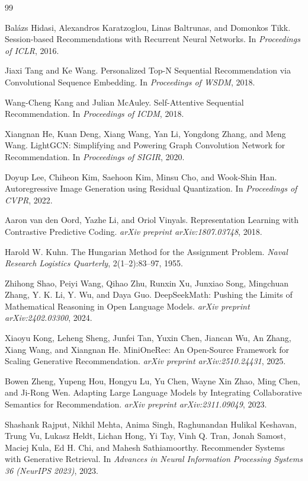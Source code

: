 \documentclass[11pt]{article}
\begin{document}
\begin{thebibliography}{99}

Bal\'azs Hidasi, Alexandros Karatzoglou, Linas Baltrunas, and Domonkos Tikk.
Session-based Recommendations with Recurrent Neural Networks.
In \textit{Proceedings of ICLR}, 2016.

Jiaxi Tang and Ke Wang.
Personalized Top-N Sequential Recommendation via Convolutional Sequence Embedding.
In \textit{Proceedings of WSDM}, 2018.

Wang-Cheng Kang and Julian McAuley.
Self-Attentive Sequential Recommendation.
In \textit{Proceedings of ICDM}, 2018.

Xiangnan He, Kuan Deng, Xiang Wang, Yan Li, Yongdong Zhang, and Meng Wang.
LightGCN: Simplifying and Powering Graph Convolution Network for Recommendation.
In \textit{Proceedings of SIGIR}, 2020.

Doyup Lee, Chiheon Kim, Saehoon Kim, Minsu Cho, and Wook-Shin Han.
Autoregressive Image Generation using Residual Quantization.
In \textit{Proceedings of CVPR}, 2022.

Aaron van den Oord, Yazhe Li, and Oriol Vinyals.
Representation Learning with Contrastive Predictive Coding.
\textit{arXiv preprint arXiv:1807.03748}, 2018.

Harold W. Kuhn.
The Hungarian Method for the Assignment Problem.
\textit{Naval Research Logistics Quarterly}, 2(1--2):83--97, 1955.

Zhihong Shao, Peiyi Wang, Qihao Zhu, Runxin Xu, Junxiao Song, Mingchuan Zhang, Y. K. Li, Y. Wu, and Daya Guo.
DeepSeekMath: Pushing the Limits of Mathematical Reasoning in Open Language Models.
\textit{arXiv preprint arXiv:2402.03300}, 2024.

Xiaoyu Kong, Leheng Sheng, Junfei Tan, Yuxin Chen, Jiancan Wu, An Zhang, Xiang Wang, and Xiangnan He.
MiniOneRec: An Open-Source Framework for Scaling Generative Recommendation.
\textit{arXiv preprint arXiv:2510.24431}, 2025.

Bowen Zheng, Yupeng Hou, Hongyu Lu, Yu Chen, Wayne Xin Zhao, Ming Chen, and Ji-Rong Wen.
Adapting Large Language Models by Integrating Collaborative Semantics for Recommendation.
\textit{arXiv preprint arXiv:2311.09049}, 2023.

Shashank Rajput, Nikhil Mehta, Anima Singh, Raghunandan Hulikal Keshavan, Trung Vu, Lukasz Heldt, Lichan Hong, Yi Tay, Vinh Q. Tran, Jonah Samost, Maciej Kula, Ed H. Chi, and Mahesh Sathiamoorthy.
Recommender Systems with Generative Retrieval.
In \textit{Advances in Neural Information Processing Systems 36 (NeurIPS 2023)}, 2023.


\end{thebibliography}
\end{document}

